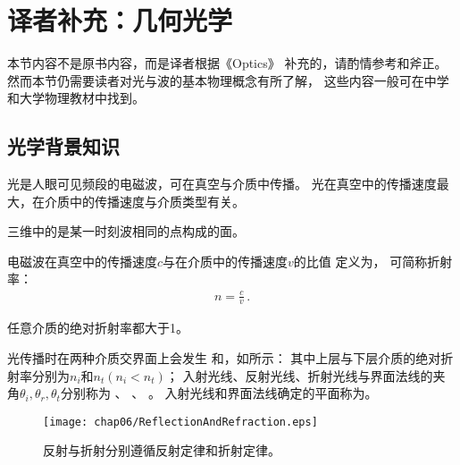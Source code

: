 \section{译者补充：几何光学}\label{sec:译者补充：几何光学}

\begin{remark}
    本节内容不是原书内容，而是译者根据《Optics》\citep{hecht2016optics}
    补充的，请酌情参考和斧正。然而本节仍需要读者对光与波的基本物理概念有所了解，
    这些内容一般可在中学和大学物理教材中找到。
\end{remark}

\subsection{光学背景知识}\label{sub:光学背景知识}
光是人眼可见频段的电磁波，可在真空与介质中传播。
光在真空中的传播速度最大，在介质中的传播速度与介质类型有关。
\begin{definition}
    三维中的是某一时刻波相同的点构成的面。
\end{definition}
\begin{definition}
    电磁波在真空中的传播速度$c$与在介质中的传播速度$v$的比值
    定义为，
    可简称折射率：
    \begin{align}
        n=\frac{c}{v}\, .
    \end{align}
\end{definition}
\begin{corollary}
    任意介质的绝对折射率都大于1。
\end{corollary}

光传播时在两种介质交界面上会发生
和，如所示：
其中上层与下层介质的绝对折射率分别为$n_i$和$n_t (n_i<n_t)$；
入射光线、反射光线、折射光线与界面法线的夹角$\theta_i, \theta_r, \theta_t$分别称为
、
、
。
入射光线和界面法线确定的平面称为。
\begin{figure}[htbp]
    \centering\texttt{[image: chap06/ReflectionAndRefraction.eps]}
    \caption{反射与折射分别遵循反射定律和折射定律。}
    \label{fig:6.26}
\end{figure}

